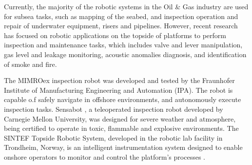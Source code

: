 
Currently, the majority of the robotic systems in the Oil \& Gas industry are
used for subsea tasks, such as mapping of the seabed, and inspection operation
and repair of underwater equipment, risers and pipelines. However, recent
research has focused on robotic applications on the topside of platforms to
perform inspection and maintenance tasks, which includes valve and lever
manipulation, gas level and leakage monitoring, acoustic anomalies diagnosis,
and identification of smoke and fire.

The MIMROex inspection robot  was developed and
tested by the Fraunhofer Institute of Manufacturing Engineering and Automation
(IPA). The robot is capable o.f safely navigate in offshore environments, and
autonomously execute inspection tasks. Sensabot , a
teleoperated inspection robot developed by Carnegie Mellon University, was
designed for severe weather and atmosphere, being certified to operate in toxic, flammable and explosive environments. The SINTEF Topside Robotic System, developed in the robotic lab facility in
Trondheim, Norway, is an intelligent instrumentation system designed to enable onshore operators
to monitor and control the platform's processes .



 

